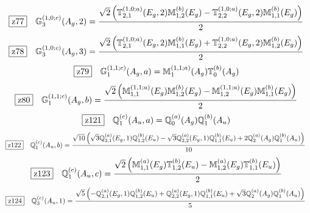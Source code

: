 \documentclass[fleqn,10pt,landscape]{jsarticle}
\begin{document}
\begin{dmath*}
\hspace*{3mm}\fbox{z77}\quad \mathbb{G}_{3}^{(1,0;c)}(A_{g},2)=\frac{\sqrt{2} \left(\mathbb{T}_{2,1}^{(1,0;a)}(E_{g},2) \mathbb{M}_{1,2}^{(b)}(E_{g}) - \mathbb{T}_{2,2}^{(1,0;a)}(E_{g},2) \mathbb{M}_{1,1}^{(b)}(E_{g})\right)}{2}
\end{dmath*}
\begin{dmath*}
\hspace*{3mm}\fbox{z78}\quad \mathbb{G}_{3}^{(1,0;c)}(A_{g},3)=\frac{\sqrt{2} \left(\mathbb{T}_{2,1}^{(1,0;a)}(E_{g},2) \mathbb{M}_{1,1}^{(b)}(E_{g}) + \mathbb{T}_{2,2}^{(1,0;a)}(E_{g},2) \mathbb{M}_{1,2}^{(b)}(E_{g})\right)}{2}
\end{dmath*}
\begin{dmath*}
\hspace*{3mm}\fbox{z79}\quad \mathbb{G}_{1}^{(1,1;c)}(A_{g},a)=\mathbb{M}_{1}^{(1,1;a)}(A_{g}) \mathbb{T}_{0}^{(b)}(A_{g})
\end{dmath*}
\begin{dmath*}
\hspace*{3mm}\fbox{z80}\quad \mathbb{G}_{1}^{(1,1;c)}(A_{g},b)=\frac{\sqrt{2} \left(\mathbb{M}_{1,1}^{(1,1;a)}(E_{g}) \mathbb{M}_{1,2}^{(b)}(E_{g}) - \mathbb{M}_{1,2}^{(1,1;a)}(E_{g}) \mathbb{M}_{1,1}^{(b)}(E_{g})\right)}{2}
\end{dmath*}
\begin{dmath*}
\hspace*{3mm}\fbox{z121}\quad \mathbb{Q}_{1}^{(c)}(A_{u},a)=\mathbb{Q}_{0}^{(a)}(A_{g}) \mathbb{Q}_{1}^{(b)}(A_{u})
\end{dmath*}
\begin{dmath*}
\hspace*{3mm}\fbox{z122}\quad \mathbb{Q}_{1}^{(c)}(A_{u},b)=\frac{\sqrt{10} \left(\sqrt{3} \mathbb{Q}_{2,1}^{(a)}(E_{g},1) \mathbb{Q}_{1,2}^{(b)}(E_{u}) - \sqrt{3} \mathbb{Q}_{2,2}^{(a)}(E_{g},1) \mathbb{Q}_{1,1}^{(b)}(E_{u}) + 2 \mathbb{Q}_{2}^{(a)}(A_{g}) \mathbb{Q}_{1}^{(b)}(A_{u})\right)}{10}
\end{dmath*}
\begin{dmath*}
\hspace*{3mm}\fbox{z123}\quad \mathbb{Q}_{1}^{(c)}(A_{u},c)=\frac{\sqrt{2} \left(\mathbb{M}_{1,1}^{(a)}(E_{g}) \mathbb{T}_{1,2}^{(b)}(E_{u}) - \mathbb{M}_{1,2}^{(a)}(E_{g}) \mathbb{T}_{1,1}^{(b)}(E_{u})\right)}{2}
\end{dmath*}
\begin{dmath*}
\hspace*{3mm}\fbox{z124}\quad \mathbb{Q}_{3}^{(c)}(A_{u},1)=\frac{\sqrt{5} \left(- \mathbb{Q}_{2,1}^{(a)}(E_{g},1) \mathbb{Q}_{1,2}^{(b)}(E_{u}) + \mathbb{Q}_{2,2}^{(a)}(E_{g},1) \mathbb{Q}_{1,1}^{(b)}(E_{u}) + \sqrt{3} \mathbb{Q}_{2}^{(a)}(A_{g}) \mathbb{Q}_{1}^{(b)}(A_{u})\right)}{5}
\end{dmath*}
\end{document}
